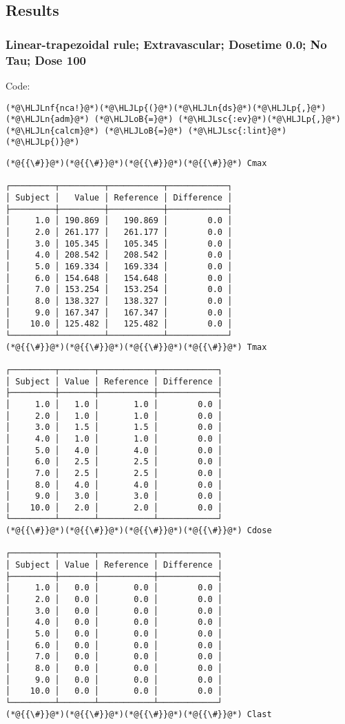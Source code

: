 \documentclass[12pt,a4paper]{article}
\newcommand{\HLJLn}[1]{#1}
\newcommand{\HLJLnf}[1]{\textcolor[RGB]{66,102,213}{#1}}
\newcommand{\HLJLsc}[1]{\textcolor[RGB]{201,61,57}{#1}}
\newcommand{\HLJLoB}[1]{\textcolor[RGB]{102,102,102}{\textbf{#1}}}
\newcommand{\HLJLp}[1]{#1}
\begin{document}
\subsection{Results}
\subsubsection{Linear-trapezoidal rule; Extravascular; Dosetime 0.0; No Tau; Dose 100}
Code:


\begin{lstlisting}
(*@\HLJLnf{nca!}@*)(*@\HLJLp{(}@*)(*@\HLJLn{ds}@*)(*@\HLJLp{,}@*) (*@\HLJLn{adm}@*) (*@\HLJLoB{=}@*) (*@\HLJLsc{:ev}@*)(*@\HLJLp{,}@*) (*@\HLJLn{calcm}@*) (*@\HLJLoB{=}@*) (*@\HLJLsc{:lint}@*)(*@\HLJLp{)}@*)
\end{lstlisting}

\begin{lstlisting}
(*@{{\#}}@*)(*@{{\#}}@*)(*@{{\#}}@*)(*@{{\#}}@*) Cmax

┌─────────┬─────────┬───────────┬────────────┐
│ Subject │   Value │ Reference │ Difference │
├─────────┼─────────┼───────────┼────────────┤
│     1.0 │ 190.869 │   190.869 │        0.0 │
│     2.0 │ 261.177 │   261.177 │        0.0 │
│     3.0 │ 105.345 │   105.345 │        0.0 │
│     4.0 │ 208.542 │   208.542 │        0.0 │
│     5.0 │ 169.334 │   169.334 │        0.0 │
│     6.0 │ 154.648 │   154.648 │        0.0 │
│     7.0 │ 153.254 │   153.254 │        0.0 │
│     8.0 │ 138.327 │   138.327 │        0.0 │
│     9.0 │ 167.347 │   167.347 │        0.0 │
│    10.0 │ 125.482 │   125.482 │        0.0 │
└─────────┴─────────┴───────────┴────────────┘
(*@{{\#}}@*)(*@{{\#}}@*)(*@{{\#}}@*)(*@{{\#}}@*) Tmax

┌─────────┬───────┬───────────┬────────────┐
│ Subject │ Value │ Reference │ Difference │
├─────────┼───────┼───────────┼────────────┤
│     1.0 │   1.0 │       1.0 │        0.0 │
│     2.0 │   1.0 │       1.0 │        0.0 │
│     3.0 │   1.5 │       1.5 │        0.0 │
│     4.0 │   1.0 │       1.0 │        0.0 │
│     5.0 │   4.0 │       4.0 │        0.0 │
│     6.0 │   2.5 │       2.5 │        0.0 │
│     7.0 │   2.5 │       2.5 │        0.0 │
│     8.0 │   4.0 │       4.0 │        0.0 │
│     9.0 │   3.0 │       3.0 │        0.0 │
│    10.0 │   2.0 │       2.0 │        0.0 │
└─────────┴───────┴───────────┴────────────┘
(*@{{\#}}@*)(*@{{\#}}@*)(*@{{\#}}@*)(*@{{\#}}@*) Cdose

┌─────────┬───────┬───────────┬────────────┐
│ Subject │ Value │ Reference │ Difference │
├─────────┼───────┼───────────┼────────────┤
│     1.0 │   0.0 │       0.0 │        0.0 │
│     2.0 │   0.0 │       0.0 │        0.0 │
│     3.0 │   0.0 │       0.0 │        0.0 │
│     4.0 │   0.0 │       0.0 │        0.0 │
│     5.0 │   0.0 │       0.0 │        0.0 │
│     6.0 │   0.0 │       0.0 │        0.0 │
│     7.0 │   0.0 │       0.0 │        0.0 │
│     8.0 │   0.0 │       0.0 │        0.0 │
│     9.0 │   0.0 │       0.0 │        0.0 │
│    10.0 │   0.0 │       0.0 │        0.0 │
└─────────┴───────┴───────────┴────────────┘
(*@{{\#}}@*)(*@{{\#}}@*)(*@{{\#}}@*)(*@{{\#}}@*) Clast


\end{lstlisting}
\end{document}
